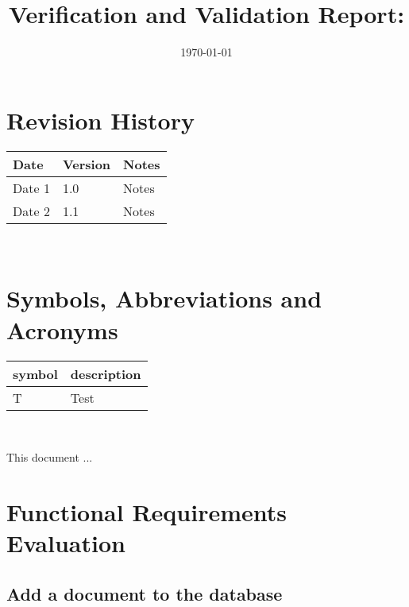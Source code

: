 \documentclass[12pt, titlepage]{article}
\begin{document}
\title{Verification and Validation Report: \progname} 
\author{\authname}
\date{\today}
	
\maketitle


\section{Revision History}

\begin{tabularx}{\textwidth}{p{3cm}p{2cm}X}
\toprule {\bf Date} & {\bf Version} & {\bf Notes}\\
\midrule
Date 1 & 1.0 & Notes\\
Date 2 & 1.1 & Notes\\
\bottomrule
\end{tabularx}

~\newpage

\section{Symbols, Abbreviations and Acronyms}

\renewcommand{\arraystretch}{1.2}
\begin{tabular}{l l} 
  \toprule		
  \textbf{symbol} & \textbf{description}\\
  \midrule 
  T & Test\\
  \bottomrule
\end{tabular}\\


\newpage

\tableofcontents

\listoftables %

\listoffigures %

\newpage


This document ...

\section{Functional Requirements Evaluation} \label{section:3} 

\subsection{Add a document to the database} \label{section:3.1}
\end{document}
